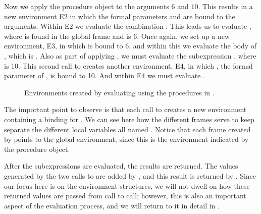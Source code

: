 Now we apply the procedure object  to the arguments \( 6 \) and \( 10 \).
This results in a new environment E2 in which the formal parameters  and  are bound to the arguments.
Within E2 we evaluate the combination .
This leads us to evaluate , where  is found in the global frame and  is \( 6 \).
Once again, we set up a new environment, E3, in which  is bound to \( 6 \), and within this we evaluate the body of , which is .
Also as part of applying , we must evaluate the subexpression , where  is 10.
This second call to  creates another environment, E4, in which , the formal parameter of , is bound to 10.
And within E4 we must evaluate .

\begin{figure}[tb]
	\centering
	
	\caption{
		Environments created by evaluating  using the procedures in .
	}
	\label{Figure 3.5}
\end{figure}

The important point to observe is that each call to  creates a new environment containing a binding for .
We can see here how the different frames serve to keep separate the different local variables all named .
Notice that each frame created by  points to the global environment, since this is the environment indicated by the  procedure object.

After the subexpressions are evaluated, the results are returned.
The values generated by the two calls to  are added by , and this result is returned by .
Since our focus here is on the environment structures, we will not dwell on how these returned values are passed from call to call;
however, this is also an important aspect of the evaluation process, and we will return to it in detail in .



